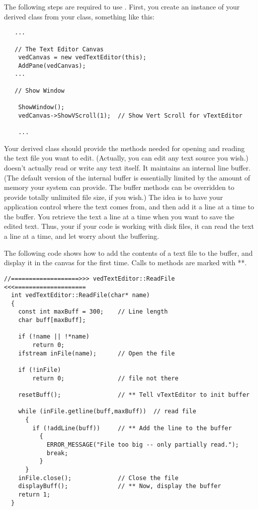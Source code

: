 The following steps are required to use . First,
you create an instance of your derived class from your 
class, something like this:

\footnotesize
\begin{verbatim}
   ...

   // The Text Editor Canvas
    vedCanvas = new vedTextEditor(this);
    AddPane(vedCanvas);
   ...

   // Show Window

    ShowWindow();
    vedCanvas->ShowVScroll(1);  // Show Vert Scroll for vTextEditor

    ...
\end{verbatim}
\normalfont\normalsize

Your derived  class should provide the methods
needed for opening and reading the text file you want to edit.
(Actually, you can edit any text source you wish.) 
doesn't actually read or write any text itself. It maintains an
internal line buffer. (The default version of the internal buffer
is essentially limited by the amount of memory your system can
provide. The buffer methods can be overridden to provide totally
unlimited file size, if you wish.) The idea is to have your
application control where the text comes from, and then
add it a line at a time to the  buffer.
You retrieve the text a line at a time when you want to save
the edited text. Thus, your if your code is working with
disk files, it can read the text a line at a time, and let
 worry about the buffering.

The following code shows how to add the contents of a text file
to the  buffer, and display it in the canvas
for the first time. Calls to  methods are
marked with **.

\footnotesize
\begin{verbatim}
//===================>>> vedTextEditor::ReadFile <<<====================
  int vedTextEditor::ReadFile(char* name)
  {
    const int maxBuff = 300;    // Line length
    char buff[maxBuff];

    if (!name || !*name)
        return 0;
    ifstream inFile(name);      // Open the file

    if (!inFile)
        return 0;               // file not there

    resetBuff();                // ** Tell vTextEditor to init buffer

    while (inFile.getline(buff,maxBuff))  // read file
      {
        if (!addLine(buff))     // ** Add the line to the buffer
          {
            ERROR_MESSAGE("File too big -- only partially read.");
            break;
          }
      }
    inFile.close();             // Close the file
    displayBuff();              // ** Now, display the buffer
    return 1;
  }
\end{verbatim}
\normalfont\normalsize

